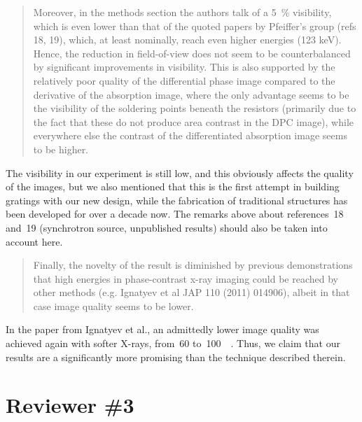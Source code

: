 \documentclass[a4paper,english]{scrartcl}
\begin{document}
\begin{quote}
    Moreover, in the methods section the authors talk of a
    \SI{5}{\percent} visibility, which is even lower than that of the quoted papers by Pfeiffer's group (refs 18, 19), which, at least nominally, reach even higher energies (123 keV). Hence, the reduction in field-of-view does not seem to be counterbalanced by significant improvements in visibility. This is also supported by the relatively poor quality of the differential phase image compared to the derivative of the absorption image, where the only advantage seems to be the visibility of the soldering points beneath the resistors (primarily due to the fact that these do not produce area contrast in the DPC image), while everywhere else the contrast of the differentiated absorption image seems to be higher.
\end{quote}
The visibility in our experiment is still low, and this obviously
affects the quality of the images, but we also mentioned
that this is the first attempt in building gratings with our new design,
while the fabrication of traditional structures has been developed for over
a decade now. The remarks above about references~18 and~19 (synchrotron
source, unpublished results) should also be taken into account here.
\begin{quote}
Finally, the novelty of the result is diminished by previous demonstrations that high energies in phase-contrast x-ray imaging could be reached by other methods (e.g. Ignatyev et al JAP 110 (2011) 014906), albeit in that case image quality seems to be lower.     
\end{quote}
In the paper from Ignatyev et al., an admittedly lower image quality was
achieved again with softer X-rays, from~\num{60}
to~\SI{100}{\kilo\voltpeak}. Thus, we claim that our results
are a significantly more promising than the technique described therein.

\section*{Reviewer \#3}
\end{document}
